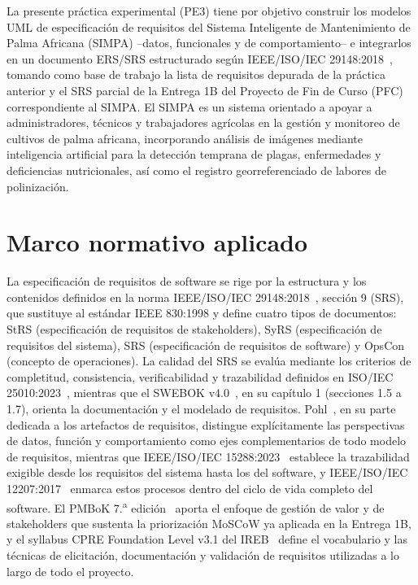 \documentclass[11pt,a4paper]{report}
\begin{document}
La presente práctica experimental (PE3) tiene por objetivo construir los modelos UML de
especificación de requisitos del Sistema Inteligente de Mantenimiento de Palma Africana (SIMPA)
--datos, funcionales y de comportamiento-- e integrarlos en un documento ERS/SRS estructurado
según IEEE/ISO/IEC 29148:2018~\cite{ieee29148}, tomando como base de trabajo la lista de requisitos
depurada de la práctica anterior y el SRS parcial de la Entrega 1B del Proyecto de Fin de Curso (PFC)
correspondiente al SIMPA. El SIMPA es un sistema orientado a apoyar a administradores, técnicos y
trabajadores agrícolas en la gestión y monitoreo de cultivos de palma africana, incorporando análisis
de imágenes mediante inteligencia artificial para la detección temprana de plagas, enfermedades y
deficiencias nutricionales, así como el registro georreferenciado de labores de polinización.

\section{Marco normativo aplicado}

La especificación de requisitos de software se rige por la estructura y los contenidos definidos en
la norma IEEE/ISO/IEC 29148:2018~\cite{ieee29148}, sección 9 (SRS), que sustituye al estándar
IEEE 830:1998 y define cuatro tipos de documentos: StRS (especificación de requisitos de
stakeholders), SyRS (especificación de requisitos del sistema), SRS (especificación de requisitos de
software) y OpsCon (concepto de operaciones). La calidad del SRS se evalúa mediante los criterios de
completitud, consistencia, verificabilidad y trazabilidad definidos en ISO/IEC 25010:2023~\cite{iso25010},
mientras que el SWEBOK v4.0~\cite{swebok2024}, en su capítulo 1 (secciones 1.5 a 1.7), orienta la
documentación y el modelado de requisitos. Pohl~\cite{pohl2025}, en su parte dedicada a los artefactos
de requisitos, distingue explícitamente las perspectivas de datos, función y comportamiento como ejes
complementarios de todo modelo de requisitos, mientras que IEEE/ISO/IEC 15288:2023~\cite{ieee15288}
establece la trazabilidad exigible desde los requisitos del sistema hasta los del software, y
IEEE/ISO/IEC 12207:2017~\cite{ieee12207} enmarca estos procesos dentro del ciclo de vida completo del
software. El PMBoK 7.\textsuperscript{a} edición~\cite{pmbok7} aporta el enfoque de gestión de valor y
de stakeholders que sustenta la priorización MoSCoW ya aplicada en la Entrega 1B, y el syllabus
CPRE Foundation Level v3.1 del IREB~\cite{ireb2023} define el vocabulario y las técnicas de elicitación,
documentación y validación de requisitos utilizadas a lo largo de todo el proyecto.
\end{document}
